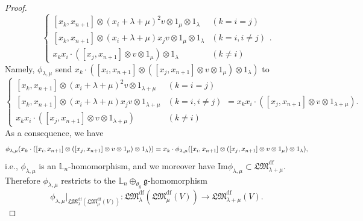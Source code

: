 \documentclass[a4paper,12pt]{article}
\theoremstyle{definition}
\theoremstyle{remark}
\begin{document}
\begin{proof}
\[
\begin{cases}
	[x_{k},x_{n+1}]\otimes(x_{i}+\lambda+\mu)^{2}v\otimes 1_{\mu}\otimes 1_{\lambda}
	&(k=i=j)\\
	[x_{k},x_{n+1}]\otimes (x_{i}+\lambda+\mu)x_{j}v\otimes 1_{\mu}\otimes 1_{\lambda}
	&(k=i, i\neq j)\\
	x_{k}x_{i}\cdot ([x_{j},x_{n+1}]\otimes v\otimes 1_{\mu})\otimes 1_{\lambda}
	&(k\neq i)
\end{cases}.
\]
Namely, $\phi_{\lambda,\mu}$ send $x_{k}\cdot ([x_{i},x_{n+1}]\otimes
	([x_{j},x_{n+1}]\otimes v\otimes 1_{\mu})\otimes 1_{\lambda})$ to  
\begin{equation*}
\begin{cases}
	[x_{k},x_{n+1}]\otimes (x_{i}+\lambda+\mu)^{2}v\otimes 1_{\lambda+\mu}
	&(k=i=j)\\
	[x_{k},x_{n+1}]\otimes (x_{i}+\lambda+\mu)x_{j}v\otimes 1_{\lambda+\mu}
	&(k=i, i\neq j)\\
	x_{k}x_{i}\cdot ([x_{j},x_{n+1}]\otimes v\otimes 1_{\lambda+\mu})
	&(k\neq i)
\end{cases}
=x_{k}x_{i}\cdot ([x_{j},x_{n+1}]\otimes v\otimes 1_{\lambda+\mu}).
\end{equation*}	
As a consequence, we have 
\begin{equation*}
\phi_{\lambda,\mu}(x_{k}\cdot ([x_{i},x_{n+1}]\otimes
	([x_{j},x_{n+1}]\otimes v\otimes 1_{\mu})\otimes 1_{\lambda}))=\\
	x_{k}\cdot \phi_{\lambda,\mu}([x_{i},x_{n+1}]\otimes
	([x_{j},x_{n+1}]\otimes v\otimes 1_{\mu})\otimes 1_{\lambda}),
\end{equation*}
i.e., $\phi_{\lambda,\mu}$ is an $\mathbb{L}_{n}$-homomorphism,
and we moreover have 
$\mathrm{Im}\phi_{\lambda,\mu}\subset \mathfrak{LM}^{\mathrm{df}}_{\lambda+\mu}$.
Therefore $\phi_{\lambda,\mu}$ restricts to the $\mathbb{L}_{n}\oplus_{\theta_{g}}\mathfrak{g}$-homomorphism
\[
	\phi_{\lambda,\mu}|_{\mathfrak{LM}_{\lambda}^{\mathrm{df}}(\mathfrak{LM}_{\mu}^{\mathrm{df}}(V))}\colon \mathfrak{LM}_{\lambda}^{\mathrm{df}}(
	\mathfrak{LM}_{\mu}^{\mathrm{df}}(V))
	\rightarrow 
	\mathfrak{LM}_{\lambda+\mu}^{\mathrm{df}}(V).
\]


\end{proof}
\end{document}
